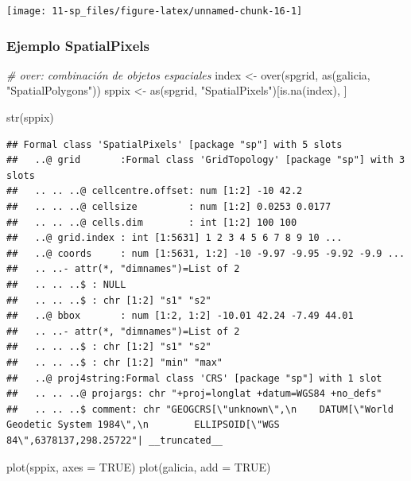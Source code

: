 \documentclass[
  spanish,
]{book}
\newenvironment{Shaded}{\begin{snugshade}}{\end{snugshade}}
\newcommand{\AttributeTok}[1]{\textcolor[rgb]{0.77,0.63,0.00}{#1}}
\newcommand{\CommentTok}[1]{\textcolor[rgb]{0.56,0.35,0.01}{\textit{#1}}}
\newcommand{\ConstantTok}[1]{\textcolor[rgb]{0.00,0.00,0.00}{#1}}
\newcommand{\FunctionTok}[1]{\textcolor[rgb]{0.00,0.00,0.00}{#1}}
\newcommand{\NormalTok}[1]{#1}
\newcommand{\OtherTok}[1]{\textcolor[rgb]{0.56,0.35,0.01}{#1}}
\newcommand{\StringTok}[1]{\textcolor[rgb]{0.31,0.60,0.02}{#1}}
\theoremstyle{break}
\begin{document}
\begin{center}\texttt{[image: 11-sp\_files/figure-latex/unnamed-chunk-16-1]} \end{center}

\hypertarget{ejemplo-spatialpixels}{%
\subsubsection{Ejemplo SpatialPixels}\label{ejemplo-spatialpixels}}

\begin{Shaded}
\begin{Highlighting}[]
\CommentTok{\# over: combinación de objetos espaciales}
\NormalTok{index }\OtherTok{\textless{}{-}} \FunctionTok{over}\NormalTok{(spgrid, }\FunctionTok{as}\NormalTok{(galicia, }\StringTok{"SpatialPolygons"}\NormalTok{))}
\NormalTok{sppix }\OtherTok{\textless{}{-}} \FunctionTok{as}\NormalTok{(spgrid, }\StringTok{"SpatialPixels"}\NormalTok{)[}\FunctionTok{is.na}\NormalTok{(index), ]}

\FunctionTok{str}\NormalTok{(sppix)}
\end{Highlighting}
\end{Shaded}

\begin{verbatim}
## Formal class 'SpatialPixels' [package "sp"] with 5 slots
##   ..@ grid       :Formal class 'GridTopology' [package "sp"] with 3 slots
##   .. .. ..@ cellcentre.offset: num [1:2] -10 42.2
##   .. .. ..@ cellsize         : num [1:2] 0.0253 0.0177
##   .. .. ..@ cells.dim        : int [1:2] 100 100
##   ..@ grid.index : int [1:5631] 1 2 3 4 5 6 7 8 9 10 ...
##   ..@ coords     : num [1:5631, 1:2] -10 -9.97 -9.95 -9.92 -9.9 ...
##   .. ..- attr(*, "dimnames")=List of 2
##   .. .. ..$ : NULL
##   .. .. ..$ : chr [1:2] "s1" "s2"
##   ..@ bbox       : num [1:2, 1:2] -10.01 42.24 -7.49 44.01
##   .. ..- attr(*, "dimnames")=List of 2
##   .. .. ..$ : chr [1:2] "s1" "s2"
##   .. .. ..$ : chr [1:2] "min" "max"
##   ..@ proj4string:Formal class 'CRS' [package "sp"] with 1 slot
##   .. .. ..@ projargs: chr "+proj=longlat +datum=WGS84 +no_defs"
##   .. .. ..$ comment: chr "GEOGCRS[\"unknown\",\n    DATUM[\"World Geodetic System 1984\",\n        ELLIPSOID[\"WGS 84\",6378137,298.25722"| __truncated__
\end{verbatim}

\begin{Shaded}
\begin{Highlighting}[]
\FunctionTok{plot}\NormalTok{(sppix, }\AttributeTok{axes =} \ConstantTok{TRUE}\NormalTok{)}
\FunctionTok{plot}\NormalTok{(galicia, }\AttributeTok{add =} \ConstantTok{TRUE}\NormalTok{)}
\end{Highlighting}
\end{Shaded}
\end{document}
